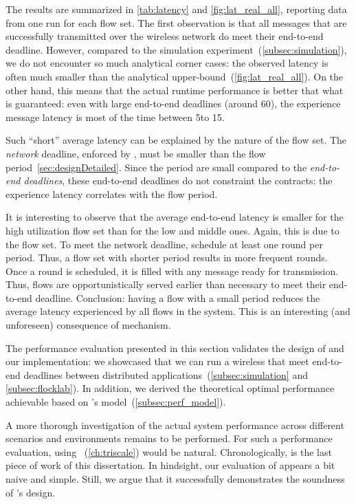 The results are summarized in \cref{tab:latency} and \cref{fig:lat_real_all}, reporting data from one run for each flow set.
The first observation is that all messages that are successfully transmitted over the wireless network do meet their end-to-end deadline.
However, compared to the simulation experiment~(\cref{subsec:simulation}), we do not encounter so much analytical corner cases: the observed latency is often much smaller than the analytical upper-bound~(\cref{fig:lat_real_all}).
On the other hand, this means that the actual runtime performance is better that what is guaranteed: even with large end-to-end deadlines (around 60\s), the experience message latency is most of the time between 5\s to 15\s.

Such ``short'' average latency can be explained by the nature of the flow set. The \emph{network} deadline, enforced by \blink, must be smaller than the flow period~\cref{sec:designDetailed}. Since the period are small compared to the \emph{end-to-end deadlines}, these end-to-end deadlines do not constraint the \DRP contracts: the experience latency correlates with the flow period.

It is interesting to observe that the average end-to-end latency is smaller for the high utilization flow set than for the low and middle ones. Again, this is due to the flow set. To meet the network deadline, \blink schedule at least one round per period. Thus, a flow set with shorter period results in more frequent rounds. Once a round is scheduled, it is filled with any message ready for transmission. Thus, flows are opportunistically served earlier than necessary to meet their end-to-end deadline. Conclusion: having a flow with a small period reduces the average latency experienced by all flows in the system. This is an interesting (and unforeseen) consequence of \DRP mechanism.

The performance evaluation presented in this section validates the design of \DRP and our implementation: we showcased that we can run a wireless \CPS that meet end-to-end deadlines between distributed applications~(\cref{subsec:simulation} and \ref{subsec:flocklab}).
In addition, we derived the theoretical optimal performance achievable based on \DRP's model~(\cref{subsec:perf_model}).

A more thorough investigation of the actual system performance across different scenarios and environments remains to be performed.
For such a performance evaluation, using \triscale~(\cref{ch:triscale}) would be natural.
%
Chronologically, \triscale is the last piece of work of this dissertation. In hindsight, our evaluation of \DRP appears a bit naive and simple. Still, we argue that it successfully demonstrates the soundness of \DRP's design.%
